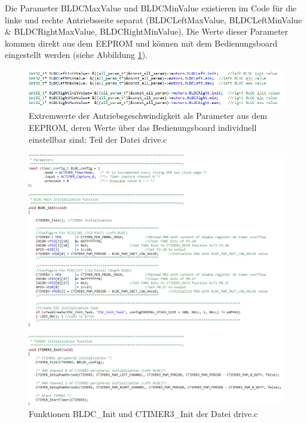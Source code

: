 Die Parameter BLDCMaxValue und BLDCMinValue existieren im Code für die linke und rechte Antriebsseite separat (\glqq{}BLDCLeftMaxValue\grqq{}, \glqq{}BLDCLeftMinValue\grqq{} \& \glqq{}BLDCRightMaxValue\grqq{}, \glqq{}BLDCRightMinValue\grqq{}). Die Werte dieser Parameter kommen direkt aus dem \ac{EEPROM} und können mit dem Bedienungsboard eingestellt werden (siehe Abbildung \ref{fig:DriveC0}).\vspace{11pt}

\begin{figure}[H] %
\includegraphics[width=.95\textwidth]{sec4/images/DriveC0} 
\centering
\captionsetup{width=.95\textwidth}
\caption[Extremwerte der Antriebsgeschwindigkeit als Parameter aus dem \ac{EEPROM}]{Extremwerte der Antriebsgeschwindigkeit als Parameter aus dem \ac{EEPROM}, deren Werte über das Bedienungsboard individuell einstellbar sind; Teil der Datei \glqq{}drive.c\grqq{}}\centering
\label{fig:DriveC0}
\end{figure}

\begin{figure}[H] %
\includegraphics[width=.90\textwidth]{sec4/images/DriveC1} 
\centering
\captionsetup{width=.95\textwidth}
\caption[Funktionen BLDC\_Init und CTIMER3\_Init der Datei \glqq{}drive.c\grqq{}]{Funktionen BLDC\_Init und CTIMER3\_Init der Datei \glqq{}drive.c\grqq{}}\centering
\label{fig:DriveC1}
\end{figure}

